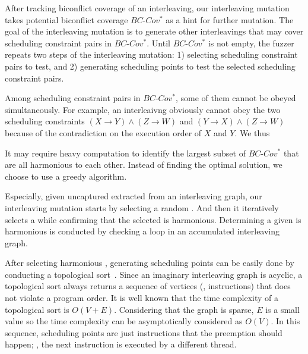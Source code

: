After tracking biconflict coverage of an interleaving, our
interleaving mutation takes potential biconflict coverage
$BC\mbox{-}Cov^*$ as a hint for further mutation.
%
The goal of the interleaving mutation is to generate other
interleavings that may cover scheduling constraint pairs in
$BC\mbox{-}Cov^*$.
%
Until $BC\mbox{-}Cov^*$ is not empty, the fuzzer repeats two steps of
the interleaving mutation:
%
1) selecting scheduling constraint pairs to test, and
2) generating scheduling points to test the selected scheduling
constraint pairs.


%
Among scheduling constraint pairs in $BC\mbox{-}Cov^*$, some of them
cannot be obeyed simultaneously.
%
For example, an interleaivng obviously cannot obey the two scheduling
constraints $(X \rightarrow Y)\wedge (Z \rightarrow W)$ and
$(Y \rightarrow X)\wedge (Z \rightarrow W)$ because of the
contradiction on the execution order of $X$ and $Y$.
%
We thus 


It may require heavy computation to identify the largest subset of
$BC\mbox{-}Cov^*$ that are all harmonious to each other.
%
Instead of finding the optimal solution, we choose to use a greedy
algorithm.
%


Especially, given uncaptured \segments extracted from an interleaving
graph, our interleaving mutation starts by selecting a random
\segment.
%
And then it iteratively selects a \segment while confirming that the
selected \segment is harmonious.
%
Determining a given \segment is harmonious is conducted by checking a
loop in an accumulated interleaving graph.



%
After selecting harmonious \segments, generating scheduling points can
be easily done by conducting a topological
sort~\cite{topologicalsort}.
%
Since an imaginary interleaving graph is acyclic, a topological sort
always returns a sequence of vertices (\ie, instructions) that does
not violate a program order.
%
It is well known that the time complexity of a topological sort is
$O(V+E)$. Considering that the graph is sparse, $E$ is a small value
so the time complexity can be asymptotically considered as $O(V)$.
%
In this sequence, scheduling points are just instructions that the
preemption should happen; \ie, the next instruction is executed by a
different thread.
%



